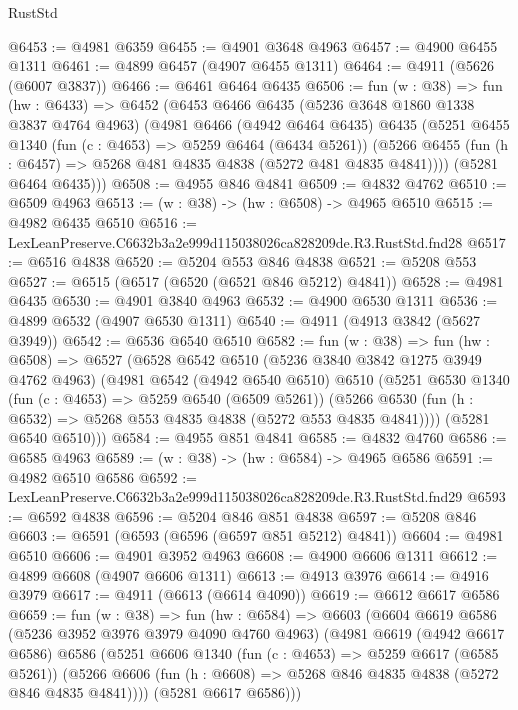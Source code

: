 \begin{lexlean}{RustStd}
\begin{coremodule}
@6453 := @4981 @6359
@6455 := @4901 @3648 @4963
@6457 := @4900 @6455 @1311
@6461 := @4899 @6457 (@4907 @6455 @1311)
@6464 := @4911 (@5626 (@6007 @3837))
@6466 := @6461 @6464 @6435
@6506 := fun (w : @38) =>
  fun (hw : @6433) =>
  @6452
    (@6453
      @6466
      @6435
      (@5236 @3648 @1860 @1338 @3837 @4764 @4963)
      (@4981
        @6466
        (@4942 @6464 @6435)
        @6435
        (@5251
          @6455
          @1340
          (fun (c : @4653) => @5259 @6464 (@6434 @5261))
          (@5266 @6455 (fun (h : @6457) => @5268 @481 @4835 @4838 (@5272 @481 @4835 @4841))))
        (@5281 @6464 @6435)))
@6508 := @4955 @846 @4841
@6509 := @4832 @4762
@6510 := @6509 @4963
@6513 := (w : @38) -> (hw : @6508) -> @4965 @6510
@6515 := @4982 @6435 @6510
@6516 := LexLeanPreserve.C6632b3a2e999d115038026ca828209de.R3.RustStd.fnd28
@6517 := @6516 @4838
@6520 := @5204 @553 @846 @4838
@6521 := @5208 @553
@6527 := @6515 (@6517 (@6520 (@6521 @846 @5212) @4841))
@6528 := @4981 @6435
@6530 := @4901 @3840 @4963
@6532 := @4900 @6530 @1311
@6536 := @4899 @6532 (@4907 @6530 @1311)
@6540 := @4911 (@4913 @3842 (@5627 @3949))
@6542 := @6536 @6540 @6510
@6582 := fun (w : @38) =>
  fun (hw : @6508) =>
  @6527
    (@6528
      @6542
      @6510
      (@5236 @3840 @3842 @1275 @3949 @4762 @4963)
      (@4981
        @6542
        (@4942 @6540 @6510)
        @6510
        (@5251
          @6530
          @1340
          (fun (c : @4653) => @5259 @6540 (@6509 @5261))
          (@5266 @6530 (fun (h : @6532) => @5268 @553 @4835 @4838 (@5272 @553 @4835 @4841))))
        (@5281 @6540 @6510)))
@6584 := @4955 @851 @4841
@6585 := @4832 @4760
@6586 := @6585 @4963
@6589 := (w : @38) -> (hw : @6584) -> @4965 @6586
@6591 := @4982 @6510 @6586
@6592 := LexLeanPreserve.C6632b3a2e999d115038026ca828209de.R3.RustStd.fnd29
@6593 := @6592 @4838
@6596 := @5204 @846 @851 @4838
@6597 := @5208 @846
@6603 := @6591 (@6593 (@6596 (@6597 @851 @5212) @4841))
@6604 := @4981 @6510
@6606 := @4901 @3952 @4963
@6608 := @4900 @6606 @1311
@6612 := @4899 @6608 (@4907 @6606 @1311)
@6613 := @4913 @3976
@6614 := @4916 @3979
@6617 := @4911 (@6613 (@6614 @4090))
@6619 := @6612 @6617 @6586
@6659 := fun (w : @38) =>
  fun (hw : @6584) =>
  @6603
    (@6604
      @6619
      @6586
      (@5236 @3952 @3976 @3979 @4090 @4760 @4963)
      (@4981
        @6619
        (@4942 @6617 @6586)
        @6586
        (@5251
          @6606
          @1340
          (fun (c : @4653) => @5259 @6617 (@6585 @5261))
          (@5266 @6606 (fun (h : @6608) => @5268 @846 @4835 @4838 (@5272 @846 @4835 @4841))))
        (@5281 @6617 @6586)))

\end{coremodule}
\end{lexlean}

